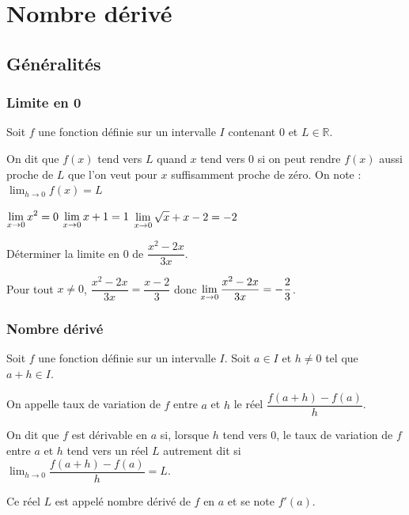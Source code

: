 \documentclass[french]{book}
\newcommand{\R}{\mathbb {R}}
\newcommand{\ds}{\displaystyle}
\newcommand{\limo}[1][x]{\ds\lim_{#1\rightarrow 0}}
\begin{document}
\tableofcontents
\setcounter{chapter}{3}
\chapter{Nombre dérivé}
\section{Généralités}
\subsection{Limite en 0}
\begin{defn}
Soit $f$ une fonction définie sur un intervalle $I$ contenant 0 et $L \in \R$.

On dit que $f(x)$ tend vers $L$ quand $x$ tend vers 0 si on peut rendre $f(x)$ aussi proche de $L$ que l'on veut pour $x$ suffisamment proche de zéro. On note : $\limo[h] f(x)=L$
\end{defn}

\begin{exemple}
$\ds \limo[x]x^{2}=0$ \hspace{1em} $\ds \limo[x]x+1=1$ \hspace{1em} $\ds \limo[x]\sqrt{x}+x-2=-2$

Déterminer la limite en 0 de $\dfrac{x^{2}-2x}{3x}$.
\end{exemple}


Pour tout $x\neq 0$, $\dfrac{x^{2}-2x}{3x}=\dfrac{x-2}{3}$ donc $\ds \limo[x]\dfrac{x^{2}-2x}{3x}=-\dfrac{2}{3}$.

%
\subsection{Nombre dérivé}
\begin{defn}
Soit $f$ une fonction définie sur un intervalle $I$. Soit $a \in I$ et $h \neq 0$ tel que $a+h \in I$.

On appelle taux de variation de $f$ entre $a$ et $h$ le réel $\dfrac{f(a+h)-f(a)}{h}$.

On dit que $f$ est dérivable en $a$ si, lorsque $h$ tend vers 0, le taux de variation de $f$ entre $a$ et $h$ tend vers un réel $L$ autrement dit si $\ds \lim_{h\rightarrow 0}\dfrac{f(a+h)-f(a)}{h}=L$.

Ce réel $L$ est appelé nombre dérivé de $f$ en $a$ et se note $f'(a)$.
\end{defn}
\end{document}
